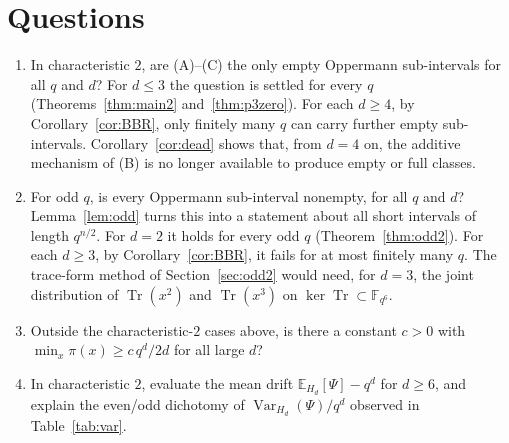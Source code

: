 \documentclass[11pt,a4paper]{amsart}
\theoremstyle{definition}
\theoremstyle{remark}
\newcommand{\F}{\mathbb{F}}
\newcommand{\Tr}{\operatorname{Tr}}
\newcommand{\E}{\mathbb{E}}
\newcommand{\Var}{\operatorname{Var}}
\begin{document}
\section{Questions}
\begin{enumerate}
\item In characteristic $2$, are (A)--(C) the only empty Oppermann sub-intervals for all $q$ and $d$? For $d\le3$ the
question is settled for every $q$ (Theorems~\ref{thm:main2} and~\ref{thm:p3zero}). For each $d\ge4$, by
Corollary~\ref{cor:BBR}, only finitely many $q$ can carry further empty sub-intervals. Corollary~\ref{cor:dead}
shows that, from $d=4$ on, the additive mechanism of (B) is no longer available to produce empty or full classes.
\item For odd $q$, is every Oppermann sub-interval nonempty, for all $q$ and $d$? Lemma~\ref{lem:odd} turns this into
a statement about all short intervals of length $q^{n/2}$. For $d=2$ it holds for every odd $q$
(Theorem~\ref{thm:odd2}). For each $d\ge3$, by Corollary~\ref{cor:BBR}, it fails for at most finitely many $q$. The
trace-form method of Section~\ref{sec:odd2} would need, for $d=3$, the joint distribution of $\Tr(x^2)$ and
$\Tr(x^3)$ on $\ker\Tr\subset\F_{q^6}$.
\item Outside the characteristic-$2$ cases above, is there a constant $c>0$ with $\min_x\pi(x)\ge c\,q^d/2d$ for all
large $d$?
\item In characteristic $2$, evaluate the mean drift $\E_{H_d}[\Psi]-q^d$ for $d\ge6$, and explain the even/odd
dichotomy of $\Var_{H_d}(\Psi)/q^d$ observed in Table~\ref{tab:var}.
\end{enumerate}
\end{document}
